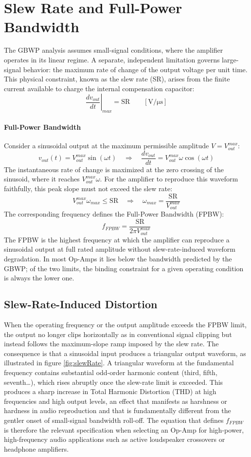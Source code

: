 \section{Slew Rate and Full-Power Bandwidth}
\label{sc:29}

The GBWP analysis assumes small-signal conditions, where the amplifier operates in its linear regime. A separate, independent limitation governs large-signal behavior: the maximum rate of change of the output voltage per unit time. This physical constraint, known as the slew rate (SR), arises from the finite current available to charge the internal compensation capacitor:
\[
\left.\frac{dv_{out}}{dt}\right|_{max} = \mathrm{SR} \qquad [\si{\volt\per\micro\second}]
\]

\paragraph{Full-Power Bandwidth}
Consider a sinusoidal output at the maximum permissible amplitude \( \hat{V} = V_{out}^{max} \):
\[
v_{out}(t) = V_{out}^{max}\sin(\omega t)
\quad\Longrightarrow\quad
\frac{dv_{out}}{dt} = V_{out}^{max} \omega\cos(\omega t)
\]
The instantaneous rate of change is maximized at the zero crossing of the sinusoid, where it reaches \( V_{out}^{max} \omega \). For the amplifier to reproduce this waveform faithfully, this peak slope must not exceed the slew rate:
\[
V_{out}^{max} \omega_{max} \leq \mathrm{SR}
\quad\Longrightarrow\quad
\omega_{max} = \frac{\mathrm{SR}}{V_{out}^{max}}
\]
The corresponding frequency defines the Full-Power Bandwidth (FPBW):
\[
f_{FPBW} = \frac{\mathrm{SR}}{2\pi V_{out}^{max}}
\]
The FPBW is the highest frequency at which the amplifier can reproduce a sinusoidal output at full rated amplitude without slew-rate-induced waveform degradation. In most Op-Amps it lies below the bandwidth predicted by the GBWP; of the two limits, the binding constraint for a given operating condition is always the lower one.

\subsection{Slew-Rate-Induced Distortion}

When the operating frequency or the output amplitude exceeds the FPBW limit, the output no longer clips horizontally as in conventional signal clipping but instead follows the maximum-slope ramp imposed by the slew rate. The consequence is that a sinusoidal input produces a triangular output waveform, as illustrated in figure \ref{fig:slewRate}. A triangular waveform at the fundamental frequency contains substantial odd-order harmonic content (third, fifth, seventh\ldots), which rises abruptly once the slew-rate limit is exceeded. This produces a sharp increase in Total Harmonic Distortion (THD) at high frequencies and high output levels, an effect that manifests as harshness or hardness in audio reproduction and that is fundamentally different from the gentler onset of small-signal bandwidth roll-off. The equation that defines \( f_{FPBW} \) is therefore the relevant specification when selecting an Op-Amp for high-power, high-frequency audio applications such as active loudspeaker crossovers or headphone amplifiers.

